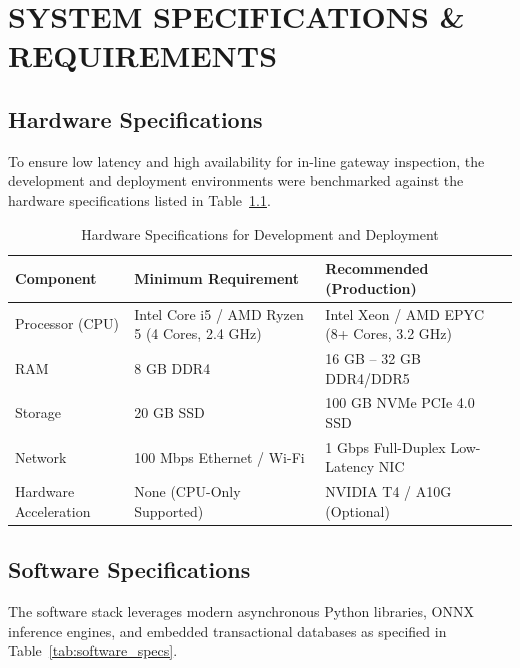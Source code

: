 \chapter{SYSTEM SPECIFICATIONS \& REQUIREMENTS}

\section{Hardware Specifications}
To ensure low latency and high availability for in-line gateway inspection, the development and deployment environments were benchmarked against the hardware specifications listed in Table~\ref{tab:hardware_specs}.

\begin{table}[htbp]
\centering
\caption{Hardware Specifications for Development and Deployment}
\label{tab:hardware_specs}
\begin{tabular}{p{3.5cm} p{5.5cm} p{5.5cm}}
\toprule
\textbf{Component} & \textbf{Minimum Requirement} & \textbf{Recommended (Production)} \\
\midrule
Processor (CPU) & Intel Core i5 / AMD Ryzen 5 (4 Cores, 2.4 GHz) & Intel Xeon / AMD EPYC (8+ Cores, 3.2 GHz) \\
RAM & 8 GB DDR4 & 16 GB -- 32 GB DDR4/DDR5 \\
Storage & 20 GB SSD & 100 GB NVMe PCIe 4.0 SSD \\
Network & 100 Mbps Ethernet / Wi-Fi & 1 Gbps Full-Duplex Low-Latency NIC \\
Hardware Acceleration & None (CPU-Only Supported) & NVIDIA T4 / A10G (Optional) \\
\bottomrule
\end{tabular}
\end{table}

\section{Software Specifications}
The software stack leverages modern asynchronous Python libraries, ONNX inference engines, and embedded transactional databases as specified in Table~\ref{tab:software_specs}.

